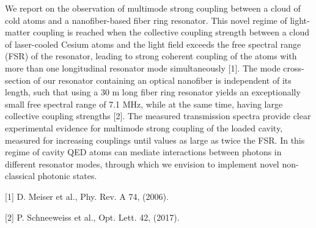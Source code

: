 \documentclass{scdpg}
\begin{document}
\begin{scAbstract}
{}
\scBeginText
We report on the observation of multimode strong coupling between a cloud of cold atoms and a nanofiber-based fiber ring resonator.
This novel regime of light-matter coupling is reached when the collective coupling strength between a cloud of laser-cooled Cesium atoms and the light field exceeds the free spectral range (FSR) of the resonator, leading to strong coherent coupling of the atoms with more than one longitudinal resonator mode simultaneously [1].
The mode cross-section of our resonator containing an optical nanofiber is independent of its length, such that using a 30 m long fiber ring resonator yields an exceptionally small free spectral range of 7.1 MHz, while at the same time, having large collective coupling strengths [2].
The measured transmission spectra provide clear experimental evidence for multimode strong coupling of the loaded cavity, measured for increasing couplings until values as large as twice the FSR.
In this regime of cavity QED atoms can mediate interactions between photons in different resonator modes, through which we envision to implement novel non-classical photonic states.

[1] D. Meiser et al., Phy. Rev. A 74, (2006).

[2]  P. Schneeweiss et al., Opt. Lett. 42, (2017).
\scEndText
{}
\end{scAbstract}
\end{document}
